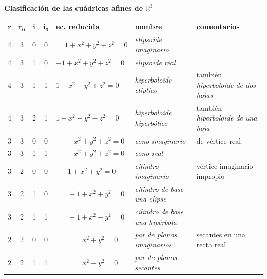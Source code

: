 \documentclass[12pt]{report}
\theoremstyle{definition}
\theoremstyle{definition}
\theoremstyle{remark}
\newcommand{\R}{\mathbb R}
\begin{document}
\begin{center}
\normalsize

\vspace{20mm}

\textbf{Clasificación de las cuádricas afines de $\R^3$}

\vspace{6mm}

\footnotesize

\begin{tabular}{|c|c|c|c|m{3cm}|m{5.4cm}|m{2.7cm}|}
     \hline
     \rowcolor{Purple1} \multicolumn{7}{|c|}{\textcolor{white}{\textbf{con centro}}} \\
     \hline
     $\mathbf{r}$ & $\mathbf{r_0}$ & $\mathbf{i}$ & $\mathbf{i_0}$ & \centering \textbf{ec. reducida} & \centering \textbf{nombre} & \centering \textbf{comentarios} \tabularnewline
     \hline
     4 & 3 & 0 & 0 & $\phantom{-}1+x^2+y^2+z^2=0$ & \textit{elipsoide imaginario} & \scriptsize \\
     \hline
     4 & 3 & 1 & 0 & $-1+x^2+y^2+z^2=0$ & \textit{elipsoide real} & \scriptsize \\
     \hline
     4 & 3 & 1 & 1 & $1-x^2+y^2+z^2=0$ & \textit{hiperboloide elíptico} & \scriptsize también \textit{hiperboloide de dos hojas} \\
     \hline
     4 & 3 & 2 & 1 & $1-x^2+y^2-z^2=0$ & \textit{hiperboloide hiperbólico} & \scriptsize también \textit{hiperboloide de una hoja} \\
     \hline
     3 & 3 & 0 & 0 & $\phantom{-1+}x^2+y^2+z^2=0$ & \textit{cono imaginario} & \scriptsize de vértice real \\
     \hline
     3 & 3 & 1 & 1 & $\phantom{-1}-x^2+y^2+z^2=0$ & \textit{cono real} & \scriptsize \\
     \hline
     3 & 2 & 0 & 0 & $\phantom{-z^2}1+x^2+y^2=0$ & \textit{cilindro imaginario} & \scriptsize vértice imaginario impropio \\
     \hline
     3 & 2 & 1 & 0 & $\phantom{+z^2}-1+x^2+y^2=0$ & \textit{cilindro de base una elipse} & \scriptsize \\
     \hline
     3 & 2 & 1 & 1 & $\phantom{+z^2}-1+x^2-y^2=0$ & \textit{cilindro de base una hipérbola} & \scriptsize \\
     \hline
     2 & 2 & 0 & 0 & $\ \: \phantom{-z^21+}x^2+y^2=0$ & \textit{par de planos imaginarios} & \scriptsize secantes en una recta real \\
     \hline
     2 & 2 & 1 & 1 & $\ \: \phantom{-z^21+}x^2-y^2=0$ & \textit{par de planos secantes} & \scriptsize \\

\end{tabular}
\end{center}
\end{document}

